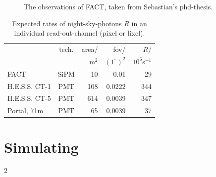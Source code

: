 \documentclass{article}%
\begin{document}
\begin{multicols}{2}
\begin{figure}[H]
\caption{
The observations of FACT, taken from Sebastian's phd-thesis.
}%
\label{fig:obstimeFact}
\end{figure}
%
\begin{table}[H]
  \begin{center}
    \begin{tabular}{lcrrr}
        &tech.& area/ & fov/&$R$/\\
        &     & m$^2$ & $(1^\circ)^{2}$&$10^6$s$^{-1}$\\
      \hline
      FACT &SiPM& 10 & 0.01 & 29\\
      H.E.S.S. CT-1 &PMT& 108 & 0.0222 & 344\\
      H.E.S.S. CT-5 &PMT& 614 & 0.0039 & 347\\
      Portal, 71m &PMT& 65 & 0.0039 & 37\\
    \end{tabular}
    \caption{Expected rates of night-sky-photons $R$ in an individual read-out-channel (pixel or lixel).}
    \label{TabInstrumentsNsbRates}
  \end{center}
\end{table}
%
\section*{Simulating}%
\label{SecSimulating}%
%

%
%
%
\end{multicols}{2}%
\end{document}
